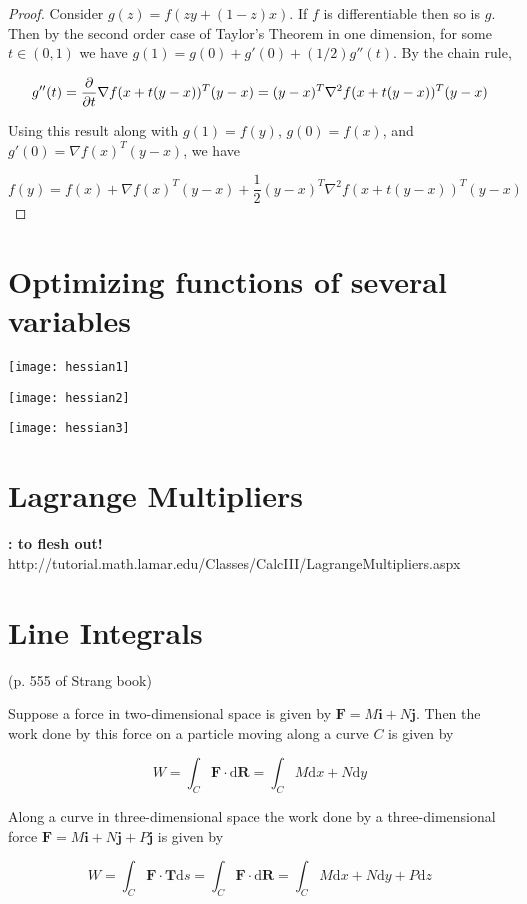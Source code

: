 \begin{proof}
Consider \(g(z) = f(zy + (1-z)x)\). If \(f\) is differentiable then so is \(g\). Then by the second order case of Taylor's Theorem in one dimension, for some \(t \in (0, 1)\) we have \(g(1) =  g(0) + g'(0) + (1/2)g''(t)\). By the chain rule,

\[
g''(t) =  \pderiv{}{t} \nabla f(x + t(y - x))^T (y - x) = (y - x)^T \nabla^2 f(x + t(y - x))^T (y - x) 
\]

Using this result along with \(g(1) = f(y)\),  \(g(0) = f(x)\), and \(g'(0) = \nabla f(x)^T (y - x) \),  we have

\[
f(y) = f(x) + \nabla f(x)^T (y - x)  + \frac{1}{2} (y - x)^T \nabla^2 f(x + t(y - x))^T (y - x) 
\]
\end{proof}

\section{Optimizing functions of several variables}

\texttt{[image: hessian1]}

\texttt{[image: hessian2]}

\texttt{[image: hessian3]}

\section{Lagrange Multipliers} \textbf{: to flesh out!} http://tutorial.math.lamar.edu/Classes/CalcIII/LagrangeMultipliers.aspx

\section{Line Integrals} (p. 555 of Strang book)

Suppose a force in two-dimensional space is given by \(\boldsymbol{F} = M\boldsymbol{i} + N \boldsymbol{j}\). Then the work done by this force on a particle moving along a curve \(C\) is given by

\[
W = \int_C \boldsymbol{F} \cdot \text{d}\boldsymbol{R} = \int_C M \text{d}x + N \text{d} y
\]

Along a curve in three-dimensional space the work done by a three-dimensional force \(\boldsymbol{F} = M\boldsymbol{i} + N \boldsymbol{j} + P \boldsymbol{j}\) is given by

\[
W = \int_C \boldsymbol{F} \cdot \boldsymbol{T} \text{d}s = \int_C \boldsymbol{F} \cdot \text{d}\boldsymbol{R} = \int_C M \text{d}x + N \text{d}y + P \text{d}z
\]

